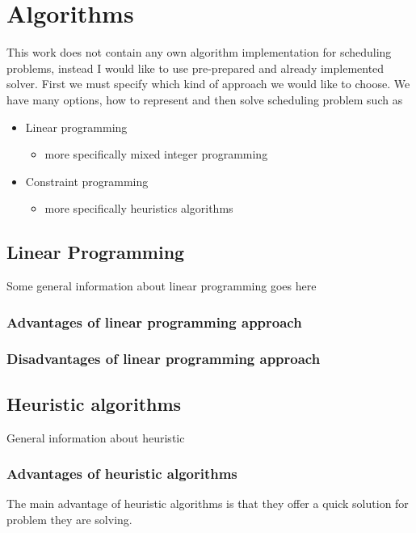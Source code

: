 
\section{Algorithms}\label{sec:algorithms}

This work does not contain any own algorithm implementation for scheduling problems,
instead I would like to use pre-prepared and already implemented solver.
First we must specify which kind of approach we would like to choose.
We have many options, how to represent and then solve scheduling problem such as
\begin{itemize}
    \item Linear programming
    \begin{itemize}
        \item more specifically mixed integer programming
    \end{itemize}
    \item Constraint programming
    \begin{itemize}
        \item more specifically heuristics algorithms
    \end{itemize}
\end{itemize}

\subsection{Linear Programming}\label{subsec:linear-programming}
Some general information about linear programming goes here %

\subsubsection{Advantages of linear programming approach}

\subsubsection{Disadvantages of linear programming approach}


\subsection{Heuristic algorithms}\label{subsec:heuristic-algorithms}
General information about heuristic %

\subsubsection{Advantages of heuristic algorithms}
The main advantage of heuristic algorithms is that they offer a quick solution for problem they are solving.

